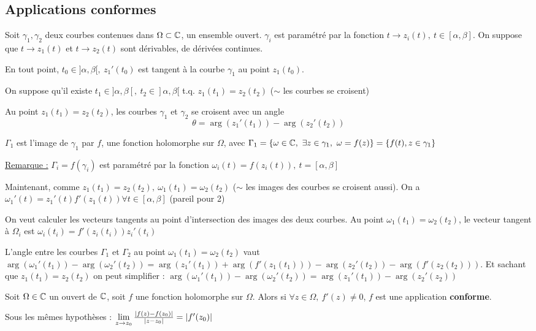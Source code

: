 \documentclass[12pt,a4paper]{article}
\begin{document}
\subsection{Applications conformes}
Soit $\gamma_1,\gamma_2$ deux courbes contenues dans $\Omega \subset \mathbb{C}$, un ensemble ouvert. $\gamma_i$ est paramétré par la fonction $t \to z_i(t),\ t \in [\alpha, \beta]$. On suppose que $t\to z_1(t)$ et $t \to z_2(t)$ sont dérivables, de dérivées continues.

En tout point, $t_0 \in ]\alpha, \beta[,\ z_1'(t_0)$ est tangent à la courbe $\gamma_1$ au point $z_1(t_0)$.

On suppose qu'il existe $t_1 \in ]\alpha,\beta[,\ t_2 \in ]\alpha,\beta[$ t.q. $z_1(t_1) = z_2(t_2)$ ($\sim$ les courbes se croisent)

Au point $z_1(t_1) = z_2(t_2)$, les courbes $\gamma_1$ et $\gamma_2$ se croisent avec un angle \[\theta = \arg(z_1'(t_1)) - \arg(z_2'(t_2))\]
\begin{boite}
     $\Gamma_1$ est l'image de $\gamma_1$ par $f$, une fonction holomorphe sur $\Omega$, avec $\Gamma_1 = \{\omega \in \mathbb{C},\ \exists z \in \gamma_1,\ \omega = f(z)\} = \{f(t), z\in \gamma_1\}$
\end{boite}
\uline{Remarque :} $\Gamma_i = f(\gamma_i)$ est paramétré par la fonction $\omega_i(t) = f(z_i(t)),\ t = [\alpha,\beta]$

Maintenant, comme $z_1(t_1) = z_2(t_2),\ \omega_1(t_1) = \omega_2(t_2)$ ($\sim$ les images des courbes se croisent aussi). On a $\omega_1'(t) = z_1'(t)f'(z_1(t)) \forall t  \in [\alpha, \beta]$ (pareil pour 2)

On veut calculer les vecteurs tangents au point d'intersection des images des deux courbes. Au point $\omega_1(t_1) = \omega_2(t_2)$, le vecteur tangent à $\Omega_i$ est $\omega_i(t_i) = f'(z_i(t_i))z_i'(t_i)$

L'angle entre les courbes $\Gamma_1$ et $\Gamma_2$ au point $\omega_1(t_1) = \omega_2(t_2)$ vaut $\arg(\omega_1'(t_1)) - \arg(\omega_2'(t_2)) = \arg(z_1'(t_1)) + \arg(f'(z_1(t_1))) - \arg(z_2'(t_2)) - \arg(f'(z_2(t_2)))$. Et sachant que $z_1(t_1) = z_2(t_2)$ on peut simplifier :
$\arg(\omega_1'(t_1)) - \arg(\omega_2'(t_2)) = \arg(z_1'(t_1)) - \arg(z_2'(z_2))$

 Soit $\Omega \in \mathbb{C}$ un ouvert de $\mathbb{C}$, soit $f$ une fonction holomorphe sur $\Omega$. Alors si $\forall z \in \Omega,\ f'(z) \neq 0$, $f$ est une application \textbf{conforme}.

 Sous les mêmes hypothèses : $\lim\limits_{z\to z_0} \frac{|f(z) - f(z_0)|}{|z-z_0|} = |f'(z_0)|$
\end{document}
